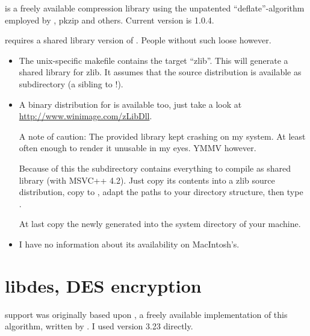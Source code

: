 \documentclass {report}
\begin{document}
\zlib{} is a freely available compression library using the
unpatented ``deflate''-algorithm employed by , \cmd
{pkzip} and others. Current version is 1.0.4.

\trf{} requires a shared library version of \zlib. People
without such  loose however.

\begin {itemize}
\item	The unix-specific makefile contains the target ``zlib''. This
	will generate a shared library for zlib. It assumes that the
	 source distribution is available as subdirectory
	 (a sibling to  !).

\item	A binary distribution for \win{} is available too, just take a
	look at
	\url{http://www.winimage.com/zLibDll}. 

	A note of caution: The provided library kept crashing on my
	\winnt{} system. At least often enough to render it unusable in
	my eyes. YMMV however.

	Because of this the subdirectory  contains
	everything to compile \zlib{} as shared library (with MSVC++
	4.2). Just copy its contents into a zlib source distribution,
	copy  to , adapt the paths
	to your directory structure, then type .

	At last copy the newly generated  into the
	system directory of your machine.

\item	I have no information about its availability on MacIntosh's.
\end   {itemize}



\chapter {libdes, DES encryption}\label {libdes}

 support was originally based upon , a freely available
implementation of this algorithm, written by \eay{}. I used version
3.23 directly.
\end{document}
